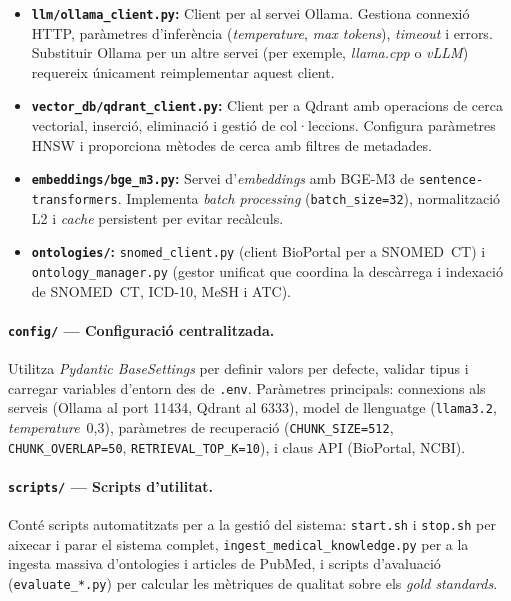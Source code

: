 \documentclass[CAT]{TFUOC}%
\begin{document}
\begin{itemize}
    \item \textbf{\texttt{llm/ollama\_client.py}:} Client per al servei Ollama. Gestiona connexió HTTP, paràmetres d'inferència (\textit{temperature}, \textit{max tokens}), \textit{timeout} i errors. Substituir Ollama per un altre servei (per exemple, \textit{llama.cpp} o \textit{vLLM}) requereix únicament reimplementar aquest client.

    \item \textbf{\texttt{vector\_db/qdrant\_client.py}:} Client per a Qdrant amb operacions de cerca vectorial, inserció, eliminació i gestió de col·leccions. Configura paràmetres HNSW i proporciona mètodes de cerca amb filtres de metadades.

    \item \textbf{\texttt{embeddings/bge\_m3.py}:} Servei d'\textit{embeddings} amb BGE-M3 de \texttt{sentence-transformers}. Implementa \textit{batch processing} (\texttt{batch\_size=32}), normalització L2 i \textit{cache} persistent per evitar recàlculs.

    \item \textbf{\texttt{ontologies/}:} \texttt{snomed\_client.py} (client BioPortal per a SNOMED~CT) i \texttt{ontology\_manager.py} (gestor unificat que coordina la descàrrega i indexació de SNOMED~CT, ICD-10, MeSH i ATC).
\end{itemize}

\paragraph{\texttt{config/} --- Configuració centralitzada.}
Utilitza \textit{Pydantic BaseSettings} per definir valors per defecte, validar tipus i carregar variables d'entorn des de \texttt{.env}. Paràmetres principals: connexions als serveis (Ollama al port 11434, Qdrant al 6333), model de llenguatge (\texttt{llama3.2}, \textit{temperature}~0,3), paràmetres de recuperació (\texttt{CHUNK\_SIZE=512}, \texttt{CHUNK\_OVERLAP=50}, \texttt{RETRIEVAL\_TOP\_K=10}), i claus API (BioPortal, NCBI).

\paragraph{\texttt{scripts/} --- Scripts d'utilitat.}
Conté scripts automatitzats per a la gestió del sistema: \texttt{start.sh} i \texttt{stop.sh} per aixecar i parar el sistema complet, \texttt{ingest\_medical\_knowledge.py} per a la ingesta massiva d'ontologies i articles de PubMed, i scripts d'avaluació (\texttt{evaluate\_*.py}) per calcular les mètriques de qualitat sobre els \textit{gold standards}.
\end{document}
